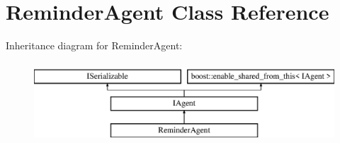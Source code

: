 \hypertarget{class_reminder_agent}{}\section{Reminder\+Agent Class Reference}
\label{class_reminder_agent}
Inheritance diagram for Reminder\+Agent\+:\begin{figure}[H]
\begin{center}
\leavevmode
\includegraphics[height=3.000000cm]{class_reminder_agent}
\end{center}
\end{figure}
